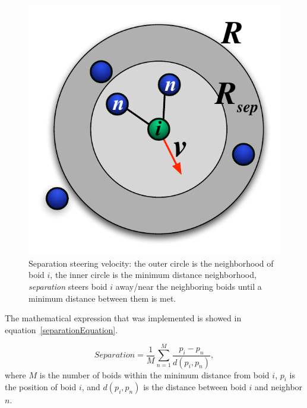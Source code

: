 \begin{figure}[htbp]
\begin{center}
\includegraphics[scale=0.85]{figures/separation.pdf}
\caption{Separation steering velocity: the outer circle is the neighborhood of boid $i$, the inner circle is the minimum distance neighborhood, \textit{separation} steers boid $i$ away/near the neighboring boids until a minimum distance between them is met.}
\label{separationPDF}
\end{center}
\end{figure}

The mathematical expression that was implemented is showed in equation~\ref{separationEquation}.

\begin{equation}
\label{separationEquation}
Separation =\frac{1}{M} \sum_{n=1}^{M} \frac{p_i - p_n}{d(p_i,p_n)},
\end{equation}
where $M$ is the number of boids within the minimum distance from boid $i$, $p_i$ is the position of boid $i$, and $d(p_i,p_n)$ is the distance between boid $i$ and neighbor $n$.


